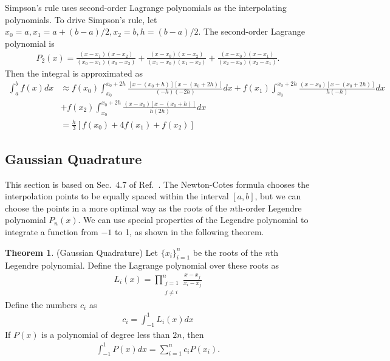 \documentclass{revtex4-2}
\theoremstyle{definition}
\newtheorem{theorem}{Theorem}
\begin{document}
Simpson's rule uses second-order Lagrange polynomials as the interpolating polynomials. To drive Simpson's rule, let
$x_0 = a, x_1 = a + (b - a)/2, x_2 = b, h = (b - a) / 2$. The second-order Lagrange polynomial is
\begin{align}
    P_2(x) = \frac{(x-x_1)(x-x_2)}{(x_0-x_1)(x_0-x_2)} + \frac{(x-x_0)(x-x_2)}{(x_1-x_0)(x_1-x_2)} 
    + \frac{(x-x_0)(x-x_1)}{(x_2-x_0)(x_2-x_1)}.
\end{align}
Then the integral is approximated as
\begin{align}
    \int_a^b f(x) dx &\approx f(x_0) \int_{x_0}^{x_0+2h} \frac{[x - (x_0 + h)][x - (x_0 + 2h)]}{(-h)(-2h)} dx 
    + f(x_1) \int_{x_0}^{x_0+2h} \frac{(x - x_0)[x - (x_0 + 2h)]}{h(-h)} dx \\
    & + f(x_2) \int_{x_0}^{x_0+2h} \frac{(x - x_0)[x - (x_0 + h)]}{h(2h)} dx \\
    &= \frac{h}{3}[f(x_0) + 4f(x_1) + f(x_2)]
\end{align}

\subsection{Gaussian Quadrature}

This section is based on Sec.~4.7 of Ref.~\cite{burden_and_faires}. The Newton-Cotes formula chooses the interpolation
points to be equally spaced within the interval $[a, b]$, but we can choose the points in a more optimal way as the
roots of the $n$th-order Legendre polynomial $P_n(x)$. We can use special properties of the Legendre polynomial to
integrate a function from $-1$ to 1, as shown in the following theorem.

\begin{theorem} (Gaussian Quadrature)
    Let $\{x_i\}_{i=1}^n$ be the roots of the $n$th Legendre polynomial. Define the Lagrange polynomial over these
    roots as
    \begin{align}
        L_i(x) = \prod_{\substack{j = 1\\ j \neq i}}^n \frac{x - x_j}{x_i - x_j}
    \end{align}
    Define the numbers $c_i$ as
    \begin{align}
        c_i = \int_{-1}^1 L_i(x) dx
    \end{align}
    If $P(x)$ is a polynomial of degree less than $2n$, then
    \begin{align}
        \int_{-1}^1 P(x) dx = \sum_{i=1}^n c_i P(x_i).
    \end{align}
\end{theorem}
\end{document}
